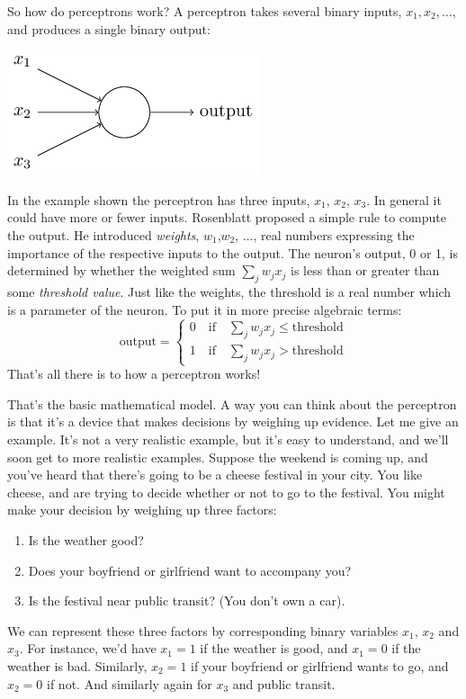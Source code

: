 \documentclass[a4paper,twoside,10pt]{book}
\begin{document}
So how do perceptrons work? A perceptron takes several binary inputs, $x_1, x_2, \ldots$,  and produces a single binary output:
\begin{center}
	\includegraphics[scale=0.5]{./figures/ch1/tikz0}
\end{center}
In the example shown the perceptron has three inputs, $x_1$, $x_2$, $x_3$. In general it could have more or fewer inputs. Rosenblatt proposed a simple rule to compute the output. He introduced \textit{weights}, $w_1$,$w_2$, $\ldots$, real numbers expressing the importance of the respective inputs to the output. The neuron's output, 0 or 1, is determined by whether the weighted sum  $\sum_j w_jx_j$ is less than or greater than some \textit{threshold value}. Just like the weights, the threshold is a real number which is a parameter of the neuron. To put it in more precise algebraic terms:
\begin{equation}
\textrm{output} = \begin{cases}
0 \quad \textrm{if}\quad \sum_j w_jx_j \le \mathrm{threshold} \\
1 \quad \textrm{if}\quad \sum_j w_jx_j > \mathrm{threshold}
\end{cases}
\end{equation}
That's all there is to how a perceptron works!

That's the basic mathematical model. A way you can think about the perceptron is that it's a device that makes decisions by weighing up evidence. Let me give an example. It's not a very realistic example, but it's easy to understand, and we'll soon get to more realistic examples. Suppose the weekend is coming up, and you've heard that there's going to be a cheese festival in your city. You like cheese, and are trying to decide whether or not to go to the festival. You might make your decision by weighing up three factors:
\begin{enumerate}
	\item Is the weather good?
	\item Does your boyfriend or girlfriend want to accompany you?
	\item Is the festival near public transit? (You don't own a car).
\end{enumerate}
We can represent these three factors by corresponding binary variables $x_1$, $x_2$ and $x_3$. For instance, we'd have $x_1=1$ if the weather is good, and $x_1=0$ if the weather is bad. Similarly, $x_2=1$ if your boyfriend or girlfriend wants to go, and $x_2=0$ if not. And similarly again for $x_3$ and public transit.
\end{document}

